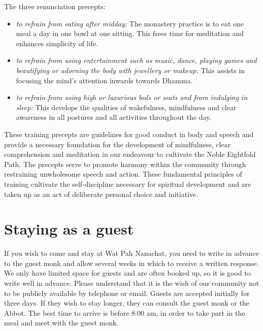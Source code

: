 The three renunciation precepts:

\begin{itemize}

  \item \emph{to refrain from eating after midday:} The monastery practice is
    to eat one meal a day in one bowl at one sitting. This frees time
    for meditation and enhances simplicity of life.

  \item \emph{to refrain from using entertainment such as music, dance,
    playing games and beautifying or adorning the body with jewellery or
  makeup:} This assists in focusing the mind's attention inwards towards
  Dhamma.

  \item \emph{to refrain from using high or luxurious beds or seats and from
    indulging in sleep:} This develops the qualities of wakefulness,
    mindfulness and clear awareness in all postures and all activities
    throughout the day.

\end{itemize}

These training precepts are guidelines for good conduct in body and
speech and provide a necessary foundation for the development of
mindfulness, clear comprehension and meditation in our endeavour to
cultivate the Noble Eightfold Path. The precepts serve to promote
harmony within the community through restraining unwholesome speech and
action. These fundamental principles of training cultivate the
self-discipline necessary for spiritual development and are taken up as
an act of deliberate personal choice and initiative.

\section{Staying as a guest}

If you wish to come and stay at Wat Pah Nanachat, you need to write in
advance to the guest monk and allow several weeks in which to receive a
written response. We only have limited space for guests and are often
booked up, so it is good to write well in advance. Please understand
that it is the wish of our community not to be publicly available by
telephone or email. Guests are accepted initially for three days. If
they wish to stay longer, they can consult the guest monk or the Abbot.
The best time to arrive is before 8:00 am, in order to take part in the
meal and meet with the guest monk.

